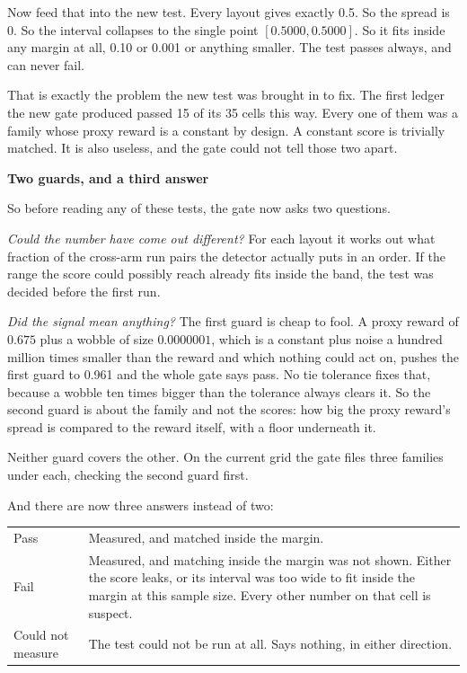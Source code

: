 \documentclass[11pt,a4paper]{article}
\newcommand{\subhead}[1]{%
  \par\vspace{0.9em}%
  {\sffamily\bfseries #1}%
  \par\vspace{0.15em}%
}
\begin{document}
Now feed that into the new test. Every layout gives exactly 0.5. So the spread is
0. So the interval collapses to the single point $[0.5000, 0.5000]$. So it fits
inside any margin at all, 0.10 or 0.001 or anything smaller. The test passes
always, and can never fail.

That is exactly the problem the new test was brought in to fix. The first ledger
the new gate produced passed 15 of its 35 cells this way. Every one of them was a
family whose proxy reward is a constant by design. A constant score is trivially
matched. It is also useless, and the gate could not tell those two apart.

\subhead{Two guards, and a third answer}
So before reading any of these tests, the gate now asks two questions.

\emph{Could the number have come out different?} For each layout it works out what
fraction of the cross-arm run pairs the detector actually puts in an order. If the
range the score could possibly reach already fits inside the band, the test was
decided before the first run.

\emph{Did the signal mean anything?} The first guard is cheap to fool. A proxy
reward of $0.675$ plus a wobble of size $0.0000001$, which is a constant plus noise
a hundred million times smaller than the reward and which nothing could act on,
pushes the first guard to 0.961 and the whole gate says pass. No tie tolerance
fixes that, because a wobble ten times bigger than the tolerance always clears it.
So the second guard is about the family and not the scores: how big the proxy
reward's spread is compared to the reward itself, with a floor underneath it.

Neither guard covers the other. On the current grid the gate files three families
under each, checking the second guard first.

And there are now three answers instead of two:

\vspace{0.3em}
\begin{tabular}{@{}lp{9.2cm}@{}}
\toprule
Pass & Measured, and matched inside the margin. \\
Fail & Measured, and matching inside the margin was not shown. Either the
       score leaks, or its interval was too wide to fit inside the margin at this
       sample size. Every other number on that cell is suspect. \\
Could not measure & The test could not be run at all. Says nothing, in either
       direction. \\
\bottomrule
\end{tabular}
\vspace{0.3em}
\end{document}
